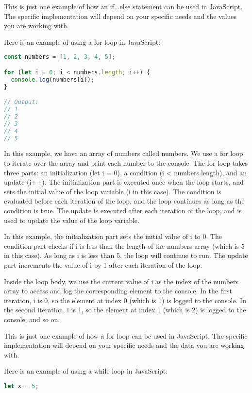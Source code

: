 {This is just one example of how an if...else statement can be used in JavaScript. The specific implementation will depend on your specific needs and the values you are working with.

Here is an example of using a for loop in JavaScript:

\begin{lstlisting}[language=Javascript, caption=Example of for loop in Javascript]
const numbers = [1, 2, 3, 4, 5];

for (let i = 0; i < numbers.length; i++) {
  console.log(numbers[i]);
}

// Output:
// 1
// 2
// 3
// 4
// 5

\end{lstlisting}
In this example, we have an array of numbers called numbers. We use a for loop to iterate over the array and print each number to the console. The for loop takes three parts: an initialization (let i = 0), a condition (i < numbers.length), and an update (i++). The initialization part is executed once when the loop starts, and sets the initial value of the loop variable (i in this case). The condition is evaluated before each iteration of the loop, and the loop continues as long as the condition is true. The update is executed after each iteration of the loop, and is used to update the value of the loop variable.

In this example, the initialization part sets the initial value of i to 0. The condition part checks if i is less than the length of the numbers array (which is 5 in this case). As long as i is less than 5, the loop will continue to run. The update part increments the value of i by 1 after each iteration of the loop.

Inside the loop body, we use the current value of i as the index of the numbers array to access and log the corresponding element to the console. In the first iteration, i is 0, so the element at index 0 (which is 1) is logged to the console. In the second iteration, i is 1, so the element at index 1 (which is 2) is logged to the console, and so on.

This is just one example of how a for loop can be used in JavaScript. The specific implementation will depend on your specific needs and the data you are working with.

Here is an example of using a while loop in JavaScript:
\begin{lstlisting}[language=Javascript, caption=Example of while loop in Javascript]
let x = 5;


\end{lstlisting}}
